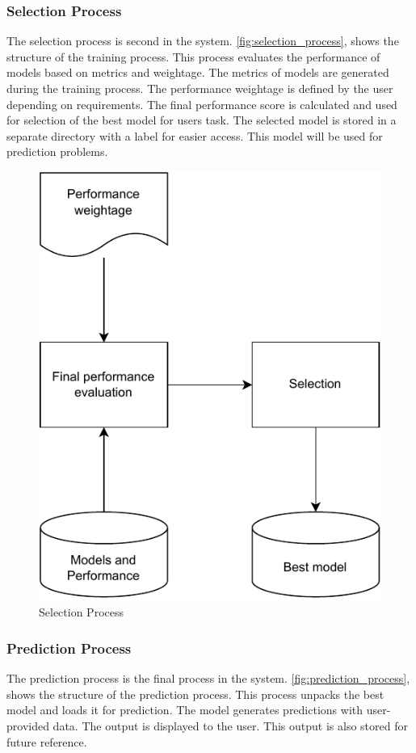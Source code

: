 \documentclass[a4paper,fleqn]{cas-dc}
\begin{document}
\subsubsection{Selection Process}\label{subsubsec:selection_process}

The selection process is second in the system. \autoref{fig:selection_process}, shows the structure of the training process. This process evaluates the performance of models based on metrics and weightage. The metrics of models are generated during the training process. The performance weightage is defined by the user depending on requirements. The final performance score is calculated and used for selection of the best model for users task. The selected model is stored in a separate directory with a label for easier access. This model will be used for prediction problems.

\begin{figure}[ht]
    \centering
    \includegraphics[width=0.6\columnwidth]{selection.pdf}
    \caption{Selection Process}
    \label{fig:selection_process}
\end{figure}

\subsubsection{Prediction Process}\label{subsubsec:prediction_process}

The prediction process is the final process in the system. \autoref{fig:prediction_process}, shows the structure of the prediction process. This process unpacks the best model and loads it for prediction. The model generates predictions with user-provided data. The output is displayed to the user. This output is also stored for future reference.
\end{document}
